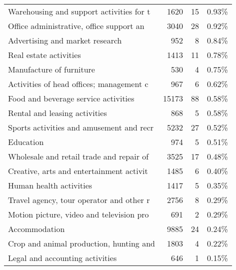\begin{tabular}{lrrl}
Warehousing and support activities for t &               1620 &         15 & 0.93\% \\
Office administrative, office support an &               3040 &         28 & 0.92\% \\
         Advertising and market research &                952 &          8 & 0.84\% \\
                  Real estate activities &               1413 &         11 & 0.78\% \\
                Manufacture of furniture &                530 &          4 & 0.75\% \\
Activities of head offices; management c &                967 &          6 & 0.62\% \\
    Food and beverage service activities &              15173 &         88 & 0.58\% \\
           Rental and leasing activities &                868 &          5 & 0.58\% \\
Sports activities and amusement and recr &               5232 &         27 & 0.52\% \\
                               Education &                974 &          5 & 0.51\% \\
Wholesale and retail trade and repair of &               3525 &         17 & 0.48\% \\
Creative, arts and entertainment activit &               1485 &          6 & 0.40\% \\
                 Human health activities &               1417 &          5 & 0.35\% \\
Travel agency, tour operator and other r &               2756 &          8 & 0.29\% \\
Motion picture, video and television pro &                691 &          2 & 0.29\% \\
                           Accommodation &               9885 &         24 & 0.24\% \\
Crop and animal production, hunting and  &               1803 &          4 & 0.22\% \\
         Legal and accounting activities &                646 &          1 & 0.15\% \\
\bottomrule
\end{tabular}
